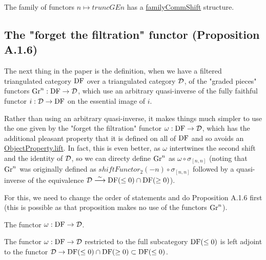 \begin{definition}
\label{def-truncGE_commShift}
\leanok
{}

The family of functors $n \mapsto truncGE n$ has a \url{familyCommShift} structure.

\end{definition}


\subsection{The "forget the filtration" functor (Proposition A.1.6)}

The next thing in the paper is the definition, when we have a filtered triangulated category
$\operatorname{DF}$ over a triangulated category $\mathcal{D}$, of the "graded pieces" functors $\operatorname{Gr}^n : \operatorname{DF} \to \mathcal{D}$, 
which use an arbitrary quasi-inverse of the fully faithful functor $i:\mathcal{D}\to\operatorname{DF}$ on the essential image of
$i$.

Rather than using an arbitrary quasi-inverse, it makes things much simpler to use the one
given by the "forget the filtration" functor $\omega : \operatorname{DF} \to \mathcal{D}$, which has the
additional pleasant property that it is defined on all of $\operatorname{DF}$ and so avoids an
\url{ObjectProperty.lift}. In fact, this is even better, as $\omega$ intertwines the
second shift and the identity of $\mathcal{D}$, so we can directy define $\operatorname{Gr}^n$ as $\omega\circ\sigma_{[n,n]}$
(noting that $\operatorname{Gr}^n$ was originally defined as $shiftFunctor_2 (-n)\circ\sigma_{[n,n]}$ followed 
by a quasi-inverse of the equivalence $\mathcal{D}\stackrel{\sim}{\longrightarrow} \operatorname{DF}(\le 0)\cap\operatorname{DF}(\ge 0)$).

For this, we need to change the order of statements and do Proposition A.1.6 first (this is
possible as that proposition makes no use of the functors $\operatorname{Gr}^n$).


\begin{definition}
\label{def-FF}

The functor $\omega:\operatorname{DF}\to\mathcal{D}$.

\end{definition}

\begin{definition}
\label{def-FF-leftAdjoint}

The functor $\omega:\operatorname{DF}\to\mathcal{D}$ restricted to the full subcategory $\operatorname{DF}(\le 0)$ is left adjoint to 
the functor $\mathcal{D} \to \operatorname{DF}(\le 0)\cap\operatorname{DF}(\ge 0)\subset\operatorname{DF}(\le 0)$.

\end{definition}

